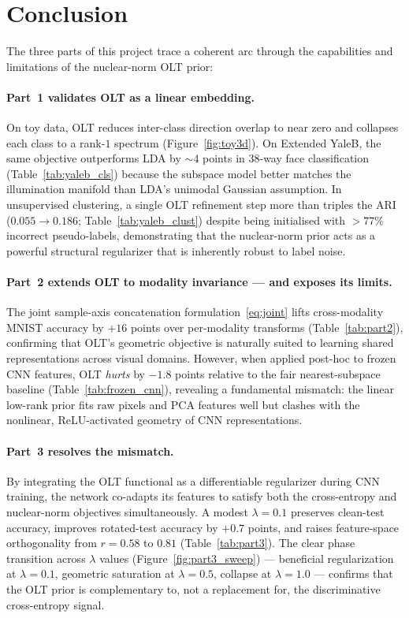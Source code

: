 \documentclass[10pt]{article}
\begin{document}
\section{Conclusion}

The three parts of this project trace a coherent arc through the
capabilities and limitations of the nuclear-norm OLT prior:

\paragraph{Part~1 validates OLT as a linear embedding.}
On toy data, OLT reduces inter-class direction overlap to near zero
and collapses each class to a rank-$1$ spectrum
(Figure~\ref{fig:toy3d}). On Extended YaleB, the same objective
outperforms LDA by $\sim\!4$ points in 38-way face classification
(Table~\ref{tab:yaleb_cls}) because the subspace model better matches
the illumination manifold than LDA's unimodal Gaussian assumption. In
unsupervised clustering, a single OLT refinement step more than
triples the ARI ($0.055\!\to\!0.186$; Table~\ref{tab:yaleb_clust})
despite being initialised with $>\!77\%$ incorrect pseudo-labels,
demonstrating that the nuclear-norm prior acts as a powerful structural
regularizer that is inherently robust to label noise.

\paragraph{Part~2 extends OLT to modality invariance --- and exposes
its limits.}
The joint sample-axis concatenation formulation~\eqref{eq:joint} lifts
cross-modality MNIST accuracy by $+16$ points over per-modality
transforms (Table~\ref{tab:part2}), confirming that OLT's geometric
objective is naturally suited to learning shared representations across
visual domains. However, when applied post-hoc to frozen CNN features,
OLT \emph{hurts} by $-1.8$ points relative to the fair
nearest-subspace baseline (Table~\ref{tab:frozen_cnn}), revealing a
fundamental mismatch: the linear low-rank prior fits raw pixels and
PCA features well but clashes with the nonlinear, ReLU-activated
geometry of CNN representations.

\paragraph{Part~3 resolves the mismatch.}
By integrating the OLT functional as a differentiable regularizer
during CNN training, the network co-adapts its features to satisfy
both the cross-entropy and nuclear-norm objectives simultaneously.
A modest $\lambda\!=\!0.1$ preserves clean-test accuracy, improves
rotated-test accuracy by $+0.7$ points, and raises feature-space
orthogonality from $r\!=\!0.58$ to $0.81$ (Table~\ref{tab:part3}).
The clear phase transition across $\lambda$ values
(Figure~\ref{fig:part3_sweep}) --- beneficial regularization at
$\lambda\!=\!0.1$, geometric saturation at $\lambda\!=\!0.5$,
collapse at $\lambda\!=\!1.0$ --- confirms that the OLT prior is
complementary to, not a replacement for, the discriminative
cross-entropy signal.
\end{document}
